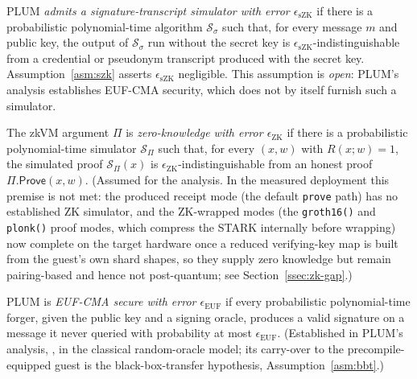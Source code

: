 \begin{definition}\label{def:szk}
PLUM \emph{admits a signature-transcript simulator with error $\epsilon_{\mathrm{sZK}}$} if there is a probabilistic polynomial-time algorithm $\mathcal{S}_\sigma$ such that, for every message $m$ and public key, the output of $\mathcal{S}_\sigma$ run without the secret key is $\epsilon_{\mathrm{sZK}}$-indistinguishable from a credential or pseudonym transcript produced with the secret key. Assumption~\ref{asm:szk} asserts $\epsilon_{\mathrm{sZK}}$ negligible. This assumption is \emph{open}: PLUM's analysis establishes EUF-CMA security, which does not by itself furnish such a simulator.
\end{definition}

\begin{definition}\label{def:zk}
The zkVM argument $\Pi$ is \emph{zero-knowledge with error $\epsilon_{\mathrm{ZK}}$} if there is a probabilistic polynomial-time simulator $\mathcal{S}_\Pi$ such that, for every $(x,w)$ with $R(x;w)=1$, the simulated proof $\mathcal{S}_\Pi(x)$ is $\epsilon_{\mathrm{ZK}}$-indistinguishable from an honest proof $\Pi.\mathsf{Prove}(x,w)$. (Assumed for the analysis. In the measured deployment this premise is not met: the produced receipt mode (the default \texttt{prove} path) has no established ZK simulator, and the ZK-wrapped modes (the \texttt{groth16()} and \texttt{plonk()} proof modes, which compress the STARK internally before wrapping) now complete on the target hardware once a reduced verifying-key map is built from the guest's own shard shapes, so they supply zero knowledge but remain pairing-based and hence not post-quantum; see Section~\ref{ssec:zk-gap}.)
\end{definition}

\begin{definition}\label{def:euf}
PLUM is \emph{EUF-CMA secure with error $\epsilon_{\mathrm{EUF}}$} if every probabilistic polynomial-time forger, given the public key and a signing oracle, produces a valid signature on a message it never queried with probability at most $\epsilon_{\mathrm{EUF}}$. (Established in PLUM's analysis, \cite[Theorem~1]{10.1007/978-981-95-2961-2_6}, in the classical random-oracle model; its carry-over to the precompile-equipped guest is the black-box-transfer hypothesis, Assumption~\ref{asm:bbt}.)
\end{definition}

